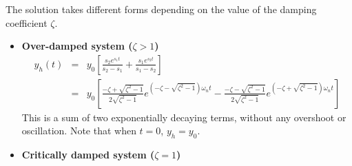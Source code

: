 \documentclass{article}
\begin{document}
The solution takes different forms depending on the value of the damping 
coefficient $\zeta$.
\begin{itemize}
\item {\bf Over-damped system ($\zeta>1$)}
  \begin{eqnarray}
    y_h(t)&=&y_0 \left[ \frac{s_2 e^{s_1t}}{s_2-s_1}+\frac{s_1 e^{s_2t}}{s_1-s_2} \right]
    \nonumber \\
    &=&y_0\left[\frac{-\zeta+\sqrt{\zeta^2-1}}{2\sqrt{\zeta^2-1}}e^{(-\zeta-\sqrt{\zeta^2-1})\omega_nt}
      -\frac{-\zeta-\sqrt{\zeta^2-1}}{2\sqrt{\zeta^2-1}}e^{(-\zeta+\sqrt{\zeta^2-1})\omega_nt}\right]
  \end{eqnarray}
  This is a sum of two exponentially decaying terms, without any overshoot 
  or oscillation. Note that when $t=0$, $y_h=y_0$. 

\item {\bf Critically damped system ($\zeta=1$)}


\end{itemize}
\end{document}
